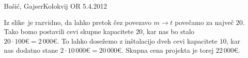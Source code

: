 \begin{naloga}{Bašić, Gajser}{Kolokvij OR 5.4.2012}
\begin{odgovor}
\begin{enumerate}[(a)]
Iz slike~ je razvidno,
da lahko pretok čez povezavo $m \to t$ povečamo za največ $20$.
Tako bomo postavili cevi skupne kapacitete $20$,
kar nas bo stalo $20 \cdot 100 € = 2\,000 €$.
To lahko dosežemo z inštalacijo dveh cevi kapacitete $10$,
kar nas dodatno stane $2 \cdot 10\,000 € = 20\,000 €$.
Skupna cena projekta je torej $22\,000 €$.
\end{enumerate}

\begin{slika}[p]
\end{slika}
\begin{slika}[p]
\end{slika}
\end{odgovor}
\end{naloga}
